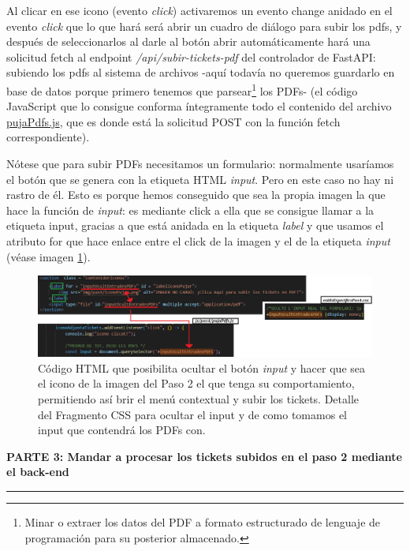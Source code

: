 \documentclass[a4paper,12pt]{report}
\begin{document}
	Al clicar en ese icono (evento \textit{click}) activaremos un evento change anidado en el evento \textit{click} que lo que hará será abrir un cuadro de diálogo para subir los pdfs, y después de seleccionarlos al darle al botón abrir automáticamente hará una solicitud fetch al endpoint \textit{/api/subir-tickets-pdf} del controlador de FastAPI: subiendo los pdfs al sistema de archivos -aquí todavía no queremos guardarlo en base de datos porque primero tenemos que parsear\footnote{Minar o extraer los datos del PDF a formato estructurado de lenguaje de programación para su posterior almacenado.} los PDFs- (el código JavaScript que lo consigue conforma íntegramente todo el contenido del archivo \href{https://github.com/blackcub3s/mercApp/blob/main/APP%20WEB/__frontend__produccio__/app/js/pas4/pujaPdfs.js}{pujaPdfs.js}, que es donde está la solicitud POST con la función fetch correspondiente).
	
	Nótese que para subir PDFs necesitamos un formulario: normalmente usaríamos el botón que se genera con la etiqueta HTML \textit{input}. Pero en este caso no hay ni rastro de él. Esto es porque hemos conseguido que sea la propia imagen la que hace la función de \textit{input}: es mediante click a ella que se consigue llamar a la etiqueta input, gracias a que está anidada en la etiqueta \textit{label} y que usamos el atributo for que hace enlace entre el click de la imagen y el de la etiqueta \textit{input} (véase imagen \ref{fig:pujarTicketsAuxiliarLabelHTML}).
	
	
	\begin{figure}[H]
		\centering
		\caption{Código HTML que posibilita ocultar el botón \textit{input} y hacer que sea el icono de la imagen del Paso 2 el que tenga su comportamiento, permitiendo así brir el menú contextual y subir los tickets. Detalle del Fragmento CSS para ocultar el input y de como tomamos el input que contendrá los PDFs con.}
		\includegraphics[width=1\linewidth]{img/pujarTicketsAuxiliarLabelHTML}

		\label{fig:pujarTicketsAuxiliarLabelHTML}
	\end{figure}
	

			
	\noindent \textbf{PARTE 3: Mandar a procesar los tickets subidos en el paso 2 mediante el back-end}
	\hrule
	\vspace{.5em}
	
\end{document}
